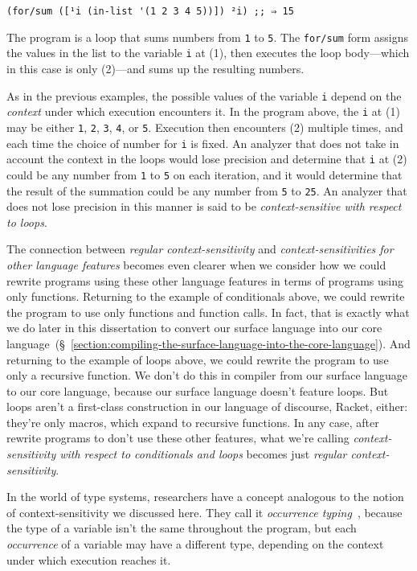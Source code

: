 \documentclass[12pt, oneside]{book}
\begin{document}
\begin{Verbatim}
(for/sum ([¹i (in-list '(1 2 3 4 5))]) ²i) ;; ⇒ 15
\end{Verbatim}

The program is a loop that sums numbers from \texttt{1} to \texttt{5}. The \texttt{for/sum} form assigns the values in the list to the variable \texttt{i} at (1), then executes the loop body—which in this case is only (2)—and sums up the resulting numbers.

As in the previous examples, the possible values of the variable \texttt{i} depend on the \emph{context} under which execution encounters it. In the program above, the \texttt{i} at (1) may be either \texttt{1}, \texttt{2}, \texttt{3}, \texttt{4}, or \texttt{5}. Execution then encounters (2) multiple times, and each time the choice of number for \texttt{i} is fixed. An analyzer that does not take in account the context in the loops would lose precision and determine that \texttt{i} at (2) could be any number from \texttt{1} to \texttt{5} on each iteration, and it would determine that the result of the summation could be any number from \texttt{5} to \texttt{25}. An analyzer that does not lose precision in this manner is said to be \emph{context-sensitive with respect to loops}.

The connection between \emph{regular context-sensitivity} and \emph{context-sensitivities for other language features} becomes even clearer when we consider how we could rewrite programs using these other language features in terms of programs using only functions. Returning to the example of conditionals above, we could rewrite the program to use only functions and function calls. In fact, that is exactly what we do later in this dissertation to convert our surface language into our core language~(§~\ref{section:compiling-the-surface-language-into-the-core-language}). And returning to the example of loops above, we could rewrite the program to use only a recursive function. We don’t do this in compiler from our surface language to our core language, because our surface language doesn’t feature loops. But loops aren’t a first-class construction in our language of discourse, Racket, either: they’re only macros, which expand to recursive functions. In any case, after rewrite programs to don’t use these other features, what we’re calling \emph{context-sensitivity with respect to conditionals and loops} becomes just \emph{regular context-sensitivity}.

In the world of type systems, researchers have a concept analogous to the notion of context-sensitivity we discussed here. They call it \emph{occurrence typing}~\cite{typed-racket}, because the type of a variable isn’t the same throughout the program, but each \emph{occurrence} of a variable may have a different type, depending on the context under which execution reaches it.
\end{document}
